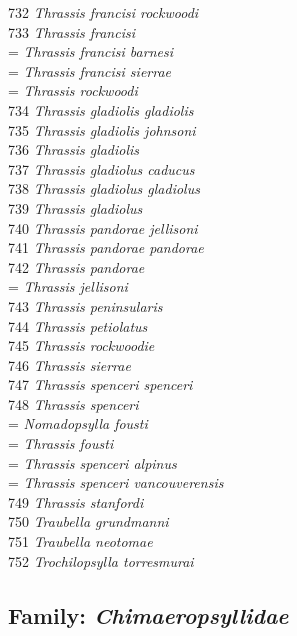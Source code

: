 \documentclass[
]{article}
\begin{document}
732 \emph{Thrassis francisi rockwoodi}\\
733 \emph{Thrassis francisi}\\
= \emph{Thrassis francisi barnesi}\\
= \emph{Thrassis francisi sierrae}\\
= \emph{Thrassis rockwoodi}\\
734 \emph{Thrassis gladiolis gladiolis}\\
735 \emph{Thrassis gladiolis johnsoni}\\
736 \emph{Thrassis gladiolis}\\
737 \emph{Thrassis gladiolus caducus}\\
738 \emph{Thrassis gladiolus gladiolus}\\
739 \emph{Thrassis gladiolus}\\
740 \emph{Thrassis pandorae jellisoni}\\
741 \emph{Thrassis pandorae pandorae}\\
742 \emph{Thrassis pandorae}\\
= \emph{Thrassis jellisoni}\\
743 \emph{Thrassis peninsularis}\\
744 \emph{Thrassis petiolatus}\\
745 \emph{Thrassis rockwoodie}\\
746 \emph{Thrassis sierrae}\\
747 \emph{Thrassis spenceri spenceri}\\
748 \emph{Thrassis spenceri}\\
= \emph{Nomadopsylla fousti}\\
= \emph{Thrassis fousti}\\
= \emph{Thrassis spenceri alpinus}\\
= \emph{Thrassis spenceri vancouverensis}\\
749 \emph{Thrassis stanfordi}\\
750 \emph{Traubella grundmanni}\\
751 \emph{Traubella neotomae}\\
752 \emph{Trochilopsylla torresmurai}

\hypertarget{family-chimaeropsyllidae}{%
\subsection{\texorpdfstring{Family:
\emph{Chimaeropsyllidae}}{Family: Chimaeropsyllidae}}\label{family-chimaeropsyllidae}}
\end{document}
